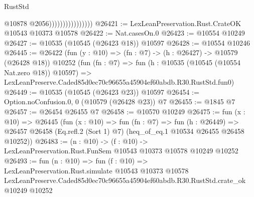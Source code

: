 \begin{lexlean}{RustStd}
\begin{coremodule}
                                    @10878
                                    @2056))))))))))))))))
@26421 := LexLeanPreservation.Rust.CrateOK @10543 @10373 @10578
@26422 := Nat.casesOn.{0}
@26423 := @10554 @10249
@26427 := @10535 (@10545 (@26423 @18)) @10597
@26428 := @10554 @10246
@26445 := @26422
    (fun (y : @10) => (fn : @7) -> (h : @26427) -> @10579 (@26428 @18))
    @10252
    (fun (fn : @7) =>
    fun (h : @10535 (@10545 (@10554 Nat.zero @18)) @10597) =>
    LexLeanPreserve.Caded85d0ec70c96655a45904ef60abdb.R30.RustStd.fun0)
@26449 := @10535 (@10545 (@26423 @23)) @10597
@26454 := Option.noConfusion.{0, 0} (@10579 (@26428 @23)) @7
@26455 := @1845 @7
@26457 := @26454 @26455 @7
@26458 := @10570 @10249
@26475 := fun (x : @10) =>
  @26445
    (fun (x : @10) =>
    fun (fn : @7) =>
    fun (h : @26449) =>
    @26457 @26458 (Eq.refl.{2} (Sort 1) @7) (heq_of_eq.{1} @10534 @26455 @26458 @10252))
@26483 := (n : @10) ->
  (f : @10) -> LexLeanPreservation.Rust.FunSem @10543 @10373 @10578 @10249 @10252
@26493 := fun (n : @10) =>
  fun (f : @10) =>
  LexLeanPreservation.Rust.simulate
    @10543
    @10373
    @10578
    LexLeanPreserve.Caded85d0ec70c96655a45904ef60abdb.R30.RustStd.crate_ok
    @10249
    @10252
\end{coremodule}
\end{lexlean}
